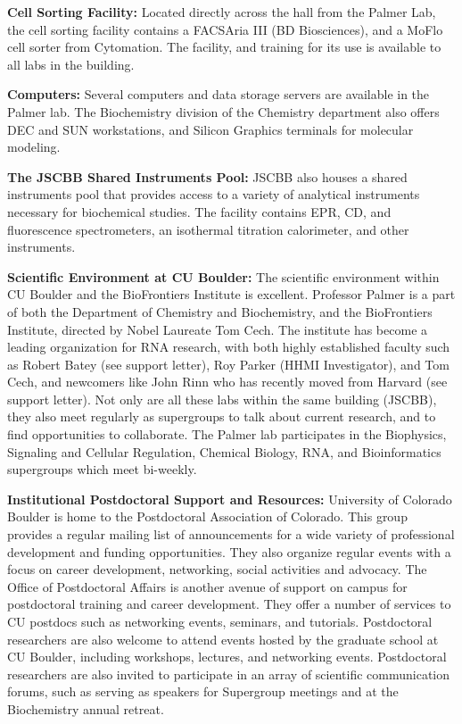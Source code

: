   {\bf Cell Sorting Facility:} Located directly across the hall from the Palmer Lab, the cell sorting facility contains a FACSAria III (BD Biosciences), and a MoFlo cell sorter from Cytomation. The facility, and training for its use is available to all labs in the building.

  {\bf Computers:} Several computers and data storage servers are available in the Palmer lab. The Biochemistry division of the Chemistry department also offers DEC and SUN workstations, and Silicon Graphics terminals for molecular modeling.

  {\bf The JSCBB Shared Instruments Pool:} JSCBB also houses a shared instruments pool that provides access to a variety of analytical instruments necessary for biochemical studies. The facility contains EPR, CD, and fluorescence spectrometers, an isothermal titration calorimeter, and other instruments.

  {\bf Scientific Environment at CU Boulder:} The scientific environment within CU Boulder and the BioFrontiers Institute is excellent. Professor Palmer is a part of both the Department of Chemistry and Biochemistry, and the BioFrontiers Institute, directed by Nobel Laureate Tom Cech. The institute has become a leading organization for RNA research, with both highly established faculty such as Robert Batey (see support letter), Roy Parker (HHMI Investigator), and Tom Cech, and newcomers like John Rinn who has recently moved from Harvard (see support letter). Not only are all these labs within the same building (JSCBB), they also meet regularly as supergroups to talk about current research, and to find opportunities to collaborate. The Palmer lab participates in the Biophysics, Signaling and Cellular Regulation, Chemical Biology, RNA, and Bioinformatics supergroups which meet bi-weekly.

  {\bf Institutional Postdoctoral Support and Resources:} University of Colorado Boulder is home to the Postdoctoral Association of Colorado. This group provides a regular mailing list of announcements for a wide variety of professional development and funding opportunities. They also organize regular events with a focus on career development, networking, social activities and advocacy. The Office of Postdoctoral Affairs is another avenue of support on campus for postdoctoral training and career development. They offer a number of services to CU postdocs such as networking events, seminars, and tutorials. Postdoctoral researchers are also welcome to attend events hosted by the graduate school at CU Boulder, including workshops, lectures, and networking events. Postdoctoral researchers are also invited to participate in an array of scientific communication forums, such as serving as speakers for Supergroup meetings and at the Biochemistry annual retreat.

